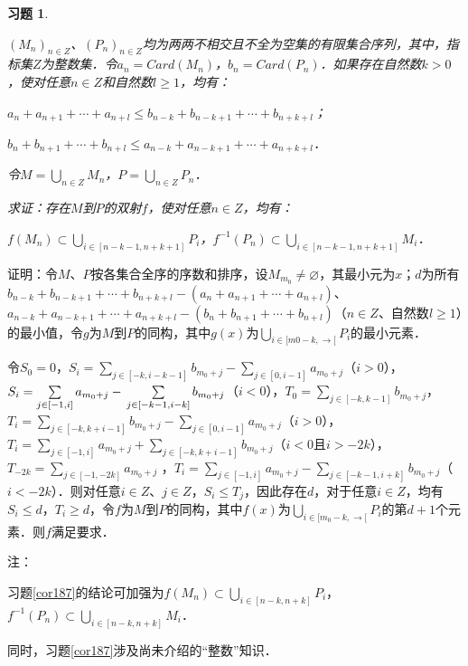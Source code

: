 \documentclass[12pt, a4paper, oneside]{book}
\newtheorem{exer}{习题}
\begin{document}
			\begin{exer}\label{exer187}
				\hfill\par
				$(M_n)_{n\in Z}$、$(P_n)_{n\in Z}$均为两两不相交且不全为空集的有限集合序列，其中，指标集$Z$为整数集．令$a_n=Card(M_n)$，$b_n=Card(P_n)$．如果存在自然数$k>0$，使对任意$n\in Z$和自然数$l\geq 1$，均有：
				\par
				$a_n+a_{n+1}+\cdots+a_{n+l}\leq b_{n-k}+b_{n-k+1}+\cdots +b_{n+k+l}$；
				\par
				$b_n+b_{n+1}+\cdots+b_{n+l}\leq a_{n-k}+a_{n-k+1}+\cdots +a_{n+k+l}$．
				\par
				令$M=\bigcup\limits_{n\in Z}M_n$，$P=\bigcup\limits_{n\in Z}P_n$．
				\par
				求证：存在$M$到$P$的双射$f$，使对任意$n\in Z$，均有：
				\par
				$f(M_n)\subset \bigcup\limits_{i\in [n-k-1, n+k+1]}P_i$，$f^{-1}(P_n)\subset \bigcup\limits_{i\in [n-k-1, n+k+1]}M_i$．
			\end{exer}
			证明：令$M$、$P$按各集合全序的序数和排序，设$M_{m_0}\neq \varnothing$，其最小元为$x$；$d$为所有\\$b_{n-k}+b_{n-k+1}+\cdots +b_{n+k+l}-(a_n+a_{n+1}+\cdots+a_{n+l})$、$a_{n-k}+a_{n-k+1}+\cdots +a_{n+k+l}-(b_n+b_{n+1}+\cdots+b_{n+l})$（$n\in Z$、自然数$l\geq 1$）的最小值，令$g$为$M$到$P$的同构，其中$g(x)$为$\bigcup\limits_{i\in [m0-k, \to [}P_i$的最小元素．
			\par
			令$S_0=0$，$S_i=\sum\limits_{j\in [-k, i-k-1]}b_{m_0+j}-\sum\limits_{j\in [0, i-1]}a_{m_0+j}$（$i>0$），$S_i=\sum\limits_{j\in [-1, i]}a_{m_0+j}-\\\sum\limits_{j\in [-k-1, i-k]}b_{m_0+j}$（$i<0$），$T_0=\sum\limits_{j\in [-k, k-1]}b_{m_0+j}$，$T_i=\sum\limits_{j\in [-k, k+i-1]}b_{m_0+j}-\sum\limits_{j\in [0, i-1]}a_{m_0+j}$（$i>0$），$T_i=\sum\limits_{j\in [-1, i]}a_{m_0+j}+\sum\limits_{j\in [-k, k+i-1]}b_{m_0+j}$（$i<0$且$i>-2k$），$T_{-2k}=\sum\limits_{j\in [-1, -2k]}a_{m_0+j}$ ，$T_i=\sum\limits_{j\in [-1, i]}a_{m_0+j}-\sum\limits_{j\in [-k-1, i+k]}b_{m_0+j}$（$i<-2k$）．则对任意$i\in Z$、$j\in Z$，$S_i\leq T_j$，因此存在$d$，对于任意$i\in Z$，均有$S_i\leq d$，$T_i\geq d$，令$f$为$M$到$P$的同构，其中$f(x)为\bigcup\limits_{i\in [m_0-k, \to [}P_i$的第$d+1$个元素．则$f$满足要求．
			\par
			注：
			\par
			习题\ref{cor187}的结论可加强为$f(M_n)\subset \bigcup\limits_{i\in [n-k, n+k]}P_i$，$f^{-1}(P_n)\subset \bigcup\limits_{i\in [n-k, n+k]}M_i$．
			\par
			同时，习题\ref{cor187}涉及尚未介绍的“整数”知识．
			
\end{document}
